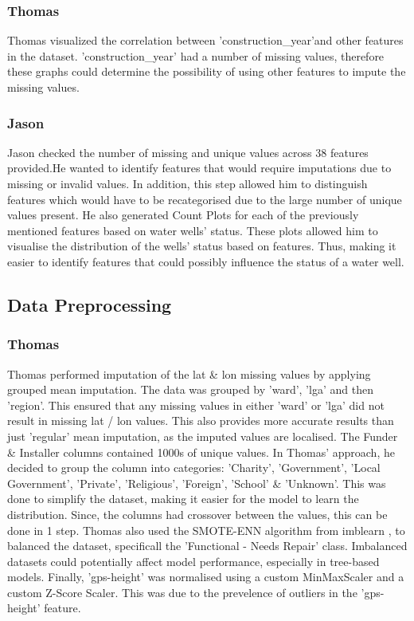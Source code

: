 \documentclass[conference]{IEEEtran}
\begin{document}
\subsubsection{Thomas}

Thomas visualized the correlation between 'construction\_year'and other features in the dataset. 'construction\_year' had a number of missing values, therefore these graphs could determine the possibility of using other features to impute the missing values.

\subsubsection{Jason}

Jason checked the number of missing and unique values across 38 features provided.He wanted to identify features that would require imputations due to missing or invalid values. In addition, this step allowed him to distinguish features which would have to be recategorised due to the large number of unique values present.  He also generated Count Plots for each of the previously mentioned features based on water wells' status. These plots allowed him to visualise the distribution of the wells' status based on features. Thus, making it easier to identify features that could possibly influence the status of a water well.

\subsection{Data Preprocessing}

\subsubsection{Thomas}

Thomas performed imputation of the lat \& lon missing values by applying grouped mean imputation. The data was grouped by 'ward', 'lga' and then 'region'. This ensured that any missing values in either 'ward' or 'lga' did not result in missing lat / lon values. This also provides more accurate results than just 'regular' mean imputation, as the imputed values are localised. The Funder \& Installer columns contained 1000s of unique values. In Thomas' approach, he decided to group the column into categories: 'Charity', 'Government', 'Local Government', 'Private', 'Religious', 'Foreign', 'School' \& 'Unknown'. This was done to simplify the dataset, making it easier for the model to learn the distribution. Since, the columns had crossover between the values, this can be done in 1 step. Thomas also used the SMOTE-ENN algorithm from imblearn \cite{smote-enn}, to balanced the dataset, specificall the 'Functional - Needs Repair' class. Imbalanced datasets could potentially affect model performance, especially in tree-based models. Finally, 'gps-height' was normalised using a custom MinMaxScaler and a custom Z-Score Scaler. This was due to the prevelence of outliers in the 'gps-height' feature.
\end{document}
